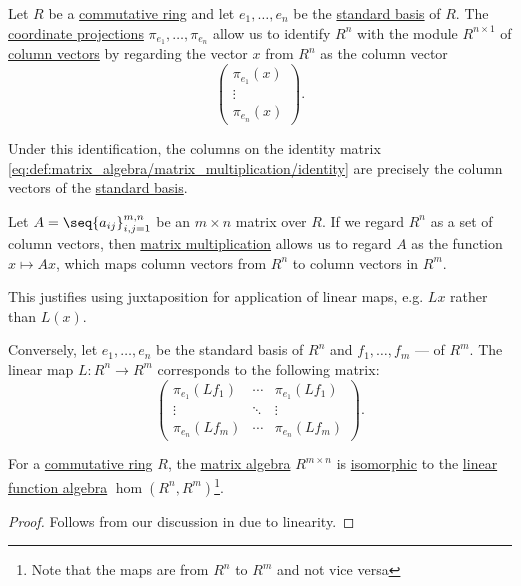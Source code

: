 \begin{remark}\label{rem:matrices_as_functions}
  Let \( R \) be a \hyperref[def:ring/commutative]{commutative ring} and let \( e_1, \ldots, e_n \) be the \hyperref[def:standard_basis]{standard basis} of \( R \). The \hyperref[def:basis_decomposition]{coordinate projections} \( \pi_{e_1}, \ldots, \pi_{e_n} \) allow us to identify \( R^n \) with the module \( R^{n \times 1} \) of \hyperref[def:array/column_vector]{column vectors} by regarding the vector \( x \) from \( R^n \) as the column vector
  \begin{equation*}
    \begin{pmatrix}
      \pi_{e_1}(x) \\
      \vdots \\
      \pi_{e_n}(x)
    \end{pmatrix}.
  \end{equation*}

  Under this identification, the columns on the identity matrix \eqref{eq:def:matrix_algebra/matrix_multiplication/identity} are precisely the column vectors of the \hyperref[def:standard_basis]{standard basis}.

  Let \( A = \seq{ a_{ij} }_{i,j=1}^{m,n} \) be an \( m \times n \) matrix over \( R \). If we regard \( R^n \) as a set of column vectors, then \hyperref[thm:matrix_algebra/matrix_multiplication]{matrix multiplication} allows us to regard \( A \) as the function \( x \mapsto Ax \), which maps column vectors from \( R^n \) to column vectors in \( R^m \).

  This justifies using juxtaposition for application of linear maps, e.g. \( Lx \) rather than \( L(x) \).

  Conversely, let \( e_1, \ldots, e_n \) be the standard basis of \( R^n \) and \( f_1, \ldots, f_m \) --- of \( R^m \). The linear map \( L: R^n \to R^m \) corresponds to the following matrix:
  \begin{equation*}
    \begin{pmatrix}
      \pi_{e_1}(L f_1) & \cdots & \pi_{e_1}(L f_1) \\
      \vdots           & \ddots & \vdots       \\
      \pi_{e_n}(L f_m) & \cdots & \pi_{e_n}(L f_m)
    \end{pmatrix}.
  \end{equation*}
\end{remark}

\begin{proposition}\label{thm:matrix_and_linear_function_algebras}
  For a \hyperref[def:ring/commutative]{commutative ring} \( R \), the \hyperref[def:matrix_algebra]{matrix algebra} \( R^{m \times n} \) is \hyperref[def:algebra_over_semiring/homomorphism]{isomorphic} to the \hyperref[thm:functions_over_algebra]{linear function algebra} \( \hom(R^n, R^m) \)\footnote{Note that the maps are from \( R^n \) to \( R^m \) and not vice versa}.
\end{proposition}
\begin{proof}
  Follows from our discussion in  due to linearity.
\end{proof}

